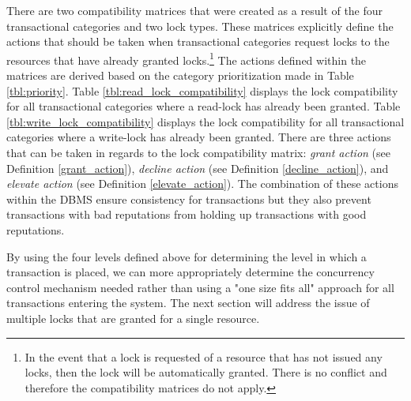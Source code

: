 \documentclass[conference]{IEEEtran}
\begin{document}
There are two compatibility matrices that were created as a result of the four transactional categories and two lock types. These matrices explicitly define the actions that should be taken when transactional categories request locks to the resources that have already granted locks.\footnote{In the event that a lock is requested of a resource that has not issued any locks, then the lock will be automatically granted. There is no conflict and therefore the compatibility matrices do not apply.} The actions defined within the matrices are derived based on the category prioritization made in Table \ref{tbl:priority}. Table \ref{tbl:read_lock_compatibility} displays the lock compatibility for all transactional categories where a read-lock has already been granted. Table \ref{tbl:write_lock_compatibility} displays the lock compatibility for all transactional categories where a write-lock has already been granted. There are three actions that can be taken in regards to the lock compatibility matrix: \textit{grant action} (see Definition \ref{grant_action}), \textit{decline action} (see Definition \ref{decline_action}), and \textit{elevate action} (see Definition \ref{elevate_action}). The combination of these actions within the DBMS ensure consistency for transactions but they also prevent transactions with bad reputations from holding up transactions with good reputations.

By using the four levels defined above for determining the level in which a transaction is placed, we can more appropriately determine the concurrency control mechanism needed rather than using a "one size fits all" approach for all transactions entering the system. The next section will address the issue of multiple locks that are granted for a single resource.
\end{document}
